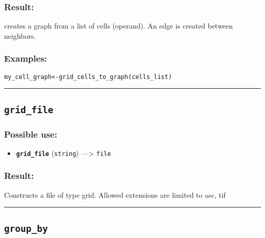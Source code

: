 \documentclass[]{book}
\providecommand{\tightlist}{%
  \setlength{\itemsep}{0pt}\setlength{\parskip}{0pt}}
\theoremstyle{definition}
\theoremstyle{definition}
\theoremstyle{definition}
\theoremstyle{remark}
\begin{document}
\subsubsection{Result:}\label{result-233}

creates a graph from a list of cells (operand). An edge is created
between neighbors.

\subsubsection{Examples:}\label{examples-183}

\begin{verbatim}
my_cell_graph<-grid_cells_to_graph(cells_list) 
\end{verbatim}

\begin{center}\rule{0.5\linewidth}{\linethickness}\end{center}

\subsection{\texorpdfstring{\texttt{grid\_file}}{grid\_file}}\label{grid_file}

\subsubsection{Possible use:}\label{possible-use-243}

\begin{itemize}
\tightlist
\item
  \textbf{\texttt{grid\_file}} (\texttt{string}) ---\textgreater{}
  \texttt{file}
\end{itemize}

\subsubsection{Result:}\label{result-234}

Constructs a file of type grid. Allowed extensions are limited to asc,
tif

\begin{center}\rule{0.5\linewidth}{\linethickness}\end{center}

\subsection{\texorpdfstring{\texttt{group\_by}}{group\_by}}\label{group_by}
\end{document}

